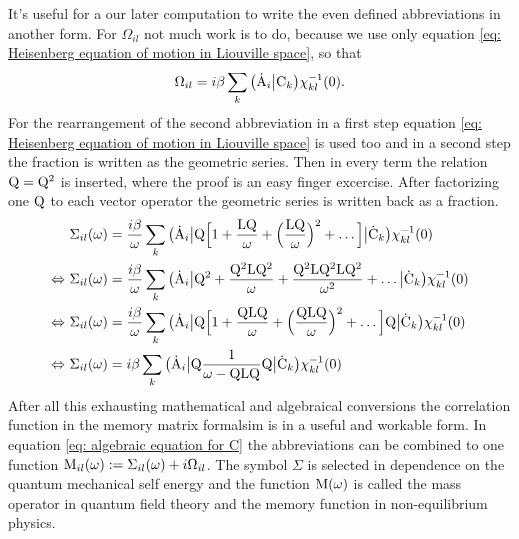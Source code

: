 It's useful for a our later computation to write the even defined abbreviations in another form.
For $\Omega_{il}$ not much work is to do, because we use only equation \eqref{eq: Heisenberg equation of motion in Liouville space}, so that
%
\begin{align}
	\Omega_{il} = i \beta \sum\limits_{k} \big({\dot{\mathrm{A}}_{i}}\big|{\mathrm{C}_{k}}\big) \chi_{kl}^{-1}(0).
	\label{eq: Omega}
\end{align}
%
For the rearrangement of the second abbreviation in a first step equation \eqref{eq: Heisenberg equation of motion in Liouville space} is used too and in a second step the fraction is written as the geometric series.
Then in every term the relation $\mathrm{Q} = \mathrm{Q}^{2}$ is inserted, where the proof is an easy finger excercise.
After factorizing one $\mathrm{Q}$ to each vector operator the geometric series is written back as a fraction.
%
\begin{align}
	&\Sigma_{il}(\omega) = \frac{i \beta}{\omega} \sum\limits_{k} \big({\dot{\mathrm{A}}_{i}}\big| \mathrm{Q} \Big[1 + \frac{\mathrm{LQ}}{\omega} + \Big(\frac{\mathrm{LQ}}{\omega}\Big)^{2} + \dots\Big] \big|{\dot{\mathrm{C}}_{k}}\big) \chi_{kl}^{-1}(0)
	\notag \\
	\Leftrightarrow\ &\Sigma_{il}(\omega) = \frac{i \beta}{\omega} \sum\limits_{k} \big({\dot{\mathrm{A}}_{i}}\big| \mathrm{Q}^{2} + \frac{\mathrm{Q^{2}LQ^{2}}}{\omega} + \frac{\mathrm{Q^{2}LQ^{2}LQ^{2}}}{\omega^{2}} + \dots\big|{\dot{\mathrm{C}}_{k}}\big) \chi_{kl}^{-1}(0)
	\notag \\
	\Leftrightarrow\ &\Sigma_{il}(\omega) = \frac{i \beta}{\omega} \sum\limits_{k} \big({\dot{\mathrm{A}}_{i}}\big| \mathrm{Q} \Big[1 + \frac{\mathrm{QLQ}}{\omega} + \Big(\frac{\mathrm{QLQ}}{\omega}\Big)^{2} + \dots\Big] \mathrm{Q} \big|{\dot{\mathrm{C}}_{k}}\big) \chi_{kl}^{-1}(0)
	\notag \\
	\Leftrightarrow\ &\Sigma_{il}(\omega) = i \beta \sum\limits_{k} \big({\dot{\mathrm{A}}_{i}}\big| \mathrm{Q} \frac{1}{\omega - \mathrm{QLQ}} \mathrm{Q} \big|{\dot{\mathrm{C}}_{k}}\big) \chi_{kl}^{-1}(0)
	\label{eq: Sigma(z)}
\end{align} 
%
After all this exhausting mathematical and algebraical conversions the correlation function in the memory matrix formalsim is in a useful and workable form.
In equation \eqref{eq: algebraic equation for C} the abbreviations can be combined to one function $\mathrm{M}_{il}(\omega) := \Sigma_{il}(\omega) +i \Omega_{il}$.
The symbol $\Sigma$ is selected in dependence on the quantum mechanical self energy and the function $\mathrm{M}(\omega)$ is called the mass operator in quantum field theory and the memory function in non-equilibrium physics.


